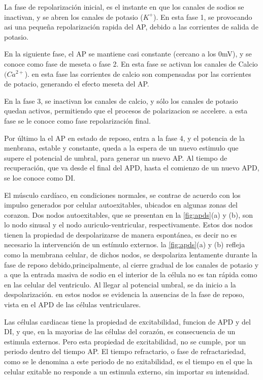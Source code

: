 La  fase de repolarización inicial, es el instante en que los canales de sodios
se inactivan, y se abren los canales de potasio ($K^+$). En esta fase 1, se
provocando asi una pequeña repolarización rapida del \ac{AP}, debido a las corrientes de
salida de potasio.

En la siguiente fase, el \ac{AP} se mantiene casi constante (cercano a los
0mV), y se conoce como fase de meseta o fase 2. En esta fase se activan los
canales de Calcio $(Ca^{2+}$). en esta fase las corrientes de calcio
son compensadas por las corrientes de potacio, generando el efecto meseta del
\ac{AP}.

En la fase 3, se inactivan los canales de calcio, y sólo los canales de
potasio quedan activos, permitiendo que el procesos de polarizacion se
accelere. a esta fase se le conoce como fase repolarización final.

Por último la el \ac{AP} en estado de reposo, entra a la fase 4, y el potencia
de la menbrana, estable y constante, queda a la espera de un nuevo estimulo que
supere el potencial de umbral, para generar un nuevo \ac{AP}. Al tiempo de
recuperación, que va desde el final del \ac{APD}, hasta el comienzo de un nuevo
\ac{APD}, se loe conoce como \ac{DI}.


El músculo cardíaco, en condiciones normales, se contrae de acuerdo con los
impulso generados por celular autoexitables, ubicados en algunas zonas del corazon. Dos
nodos autoexitables, que se presentan en la \ref{fig:apds}(a) y (b), son lo
nodo sinusal y el nodo auriculo-ventricular, respectivamente. Estos dos nodos
tienen la propiedad de despolarizarse de manera espontánea, es decir no es
necesario la intervención de un estímulo externos. la \ref{fig:apds}(a) y (b)
refleja como la membrana celular, de dichos nodos,  se despolariza lentamente
durante la fase de reposo debido,principalmente, al cierre gradual de los
canales de potasio y a que la entrada masiva de sodio en el interior de la
célula no es tan rápida como en las celular del ventriculo. Al llegar al
potencial umbral, se da inicio a la despolarización. en estos nodos se evidencia
la ausencias de la fase de reposo, vista en el \ac{APD} de las células ventriculares.


Las células cardiacas tiene la propiedad de excitabilidad, funcion de \ac{APD}
y del \ac{DI}, y que, en la mayorias de las células del corazón, es
consecuencia de un estimula externos. Pero esta propiedad  de excitabilidad, no
se cumple, por un periodo dentro del tiempo \ac{AP}. El tiempo refractario, o
fase de refractariedad, como se le denomina a este periodo de no exitabilidad,
es el tiempo en el que la celular exitable no responde a un estimula externo,
sin importar su intensidad.

